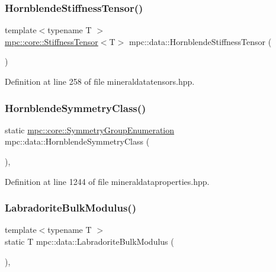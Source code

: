 \subsubsection{\texorpdfstring{Hornblende\+Stiffness\+Tensor()}{HornblendeStiffnessTensor()}}
{\footnotesize\ttfamily template$<$typename T $>$ \\
\mbox{\hyperlink{structmpc_1_1core_1_1_stiffness_tensor}{mpc\+::core\+::\+Stiffness\+Tensor}}$<$T$>$ mpc\+::data\+::\+Hornblende\+Stiffness\+Tensor (\begin{DoxyParamCaption}{ }\end{DoxyParamCaption})}



Definition at line 258 of file mineraldatatensors.\+hpp.

\mbox{\label{namespacempc_1_1data_acb272655c645b361b58acd092cb0362f}} 
\subsubsection{\texorpdfstring{Hornblende\+Symmetry\+Class()}{HornblendeSymmetryClass()}}
{\footnotesize\ttfamily static \mbox{\hyperlink{namespacempc_1_1core_a9d979684062547055a0ef5c13077bad8}{mpc\+::core\+::\+Symmetry\+Group\+Enumeration}} mpc\+::data\+::\+Hornblende\+Symmetry\+Class (\begin{DoxyParamCaption}{ }\end{DoxyParamCaption})\hspace{0.3cm}{\ttfamily [inline]}, {\ttfamily [static]}}



Definition at line 1244 of file mineraldataproperties.\+hpp.

\mbox{\label{namespacempc_1_1data_a14d2fd8625be3776965380686ab8b67d}} 
\subsubsection{\texorpdfstring{Labradorite\+Bulk\+Modulus()}{LabradoriteBulkModulus()}}
{\footnotesize\ttfamily template$<$typename T $>$ \\
static T mpc\+::data\+::\+Labradorite\+Bulk\+Modulus (\begin{DoxyParamCaption}{ }\end{DoxyParamCaption})\hspace{0.3cm}{\ttfamily [inline]}, {\ttfamily [static]}}



